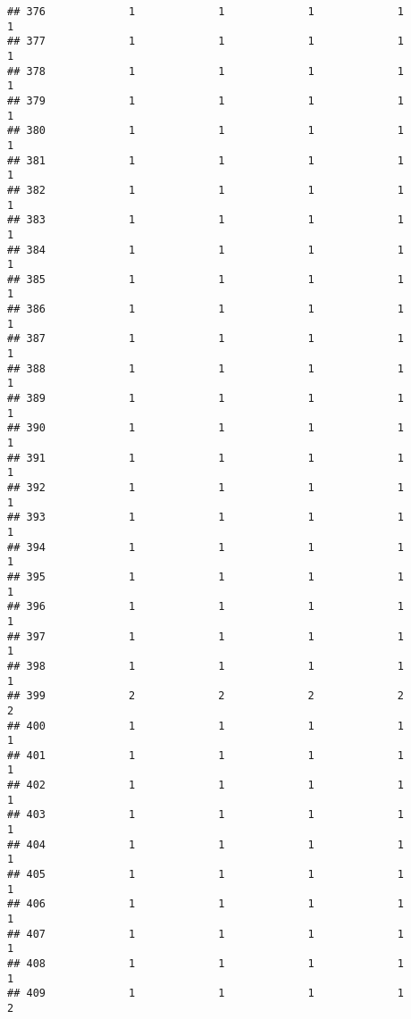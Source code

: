 \documentclass[
]{article}
\begin{document}
\begin{verbatim}
## 376             1             1             1             1             1
## 377             1             1             1             1             1
## 378             1             1             1             1             1
## 379             1             1             1             1             1
## 380             1             1             1             1             1
## 381             1             1             1             1             1
## 382             1             1             1             1             1
## 383             1             1             1             1             1
## 384             1             1             1             1             1
## 385             1             1             1             1             1
## 386             1             1             1             1             1
## 387             1             1             1             1             1
## 388             1             1             1             1             1
## 389             1             1             1             1             1
## 390             1             1             1             1             1
## 391             1             1             1             1             1
## 392             1             1             1             1             1
## 393             1             1             1             1             1
## 394             1             1             1             1             1
## 395             1             1             1             1             1
## 396             1             1             1             1             1
## 397             1             1             1             1             1
## 398             1             1             1             1             1
## 399             2             2             2             2             2
## 400             1             1             1             1             1
## 401             1             1             1             1             1
## 402             1             1             1             1             1
## 403             1             1             1             1             1
## 404             1             1             1             1             1
## 405             1             1             1             1             1
## 406             1             1             1             1             1
## 407             1             1             1             1             1
## 408             1             1             1             1             1
## 409             1             1             1             1             2

\end{verbatim}
\end{document}
